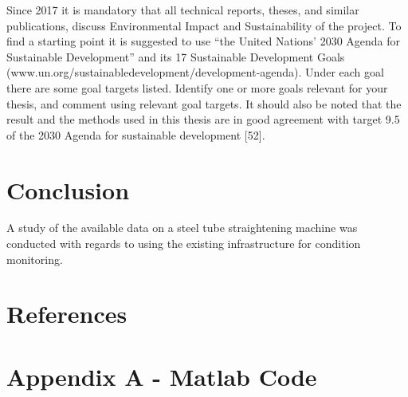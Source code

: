 \documentclass{article}
\begin{document}
Since 2017 it is mandatory that all technical reports, theses, and similar publications, discuss Environmental Impact and Sustainability of the project. To find a starting point it is suggested to use “the United Nations’ 2030 Agenda for Sustainable Development” and its 17 Sustainable Development Goals (www.un.org/sustainabledevelopment/development-agenda). Under each goal there are some goal targets listed. Identify one or more goals relevant for your thesis, and comment using relevant goal targets.
It should also be noted that the result and the methods used in this thesis are in good agreement with target 9.5 of the 2030 Agenda for sustainable development [52].
\clearpage

\section{Conclusion}
A study of the available data on a steel tube straightening machine was conducted with regards to using the existing infrastructure for condition monitoring.
\newpage

\section{References} 
\printbibliography[heading=none] 
\clearpage  
\section{Appendix A - Matlab Code}
\UseRawInputEncoding


%
\end{document}
